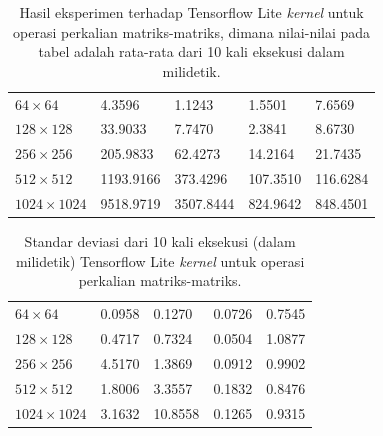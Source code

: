 \begin{table}
	\centering
	\caption{Hasil eksperimen terhadap Tensorflow Lite \textit{kernel} untuk operasi perkalian matriks-matriks, dimana nilai-nilai pada tabel adalah rata-rata dari 10 kali eksekusi dalam milidetik.}
	\label{tab:matmatmulspeed}
	\begin{tabular}{|>{\small}R{2.5cm}|>{\small}R{2.1cm}|>{\small}R{2.1cm}|>{\small}R{2.1cm}|>{\small}R{2.4cm}|}
		\hline
		 & 
		 & 
		 & 
		 & 
		 \\
		\hline
		$64 \times 64$ & 4.3596 & 1.1243 & 1.5501 & 7.6569
		\\
		\hline
		$128 \times 128$ & 33.9033 & 7.7470 & 2.3841 & 8.6730
		\\
		\hline
		$256 \times 256$ & 205.9833 & 62.4273 & 14.2164 & 21.7435
		\\
		\hline
		$512 \times 512$ & 1193.9166 & 373.4296 & 107.3510 & 116.6284
		\\
		\hline
		$1024 \times 1024$ & 9518.9719 & 3507.8444 & 824.9642 & 848.4501
		\\
		\hline
	\end{tabular}
\end{table}

\begin{table}
	\centering
	\caption{Standar deviasi dari 10 kali eksekusi (dalam milidetik) Tensorflow Lite \textit{kernel} untuk operasi perkalian matriks-matriks.}
	\label{tab:matmatmuldev}
	\begin{tabular}{|>{\small}R{2.5cm}|>{\small}R{2.1cm}|>{\small}R{2.1cm}|>{\small}R{2.1cm}|>{\small}R{2.4cm}|}
	\hline
	 & 
	 & 
	 & 
	 & 
	 \\
	\hline
		$64 \times 64$ & 0.0958 & 0.1270 & 0.0726 & 0.7545
		\\
		\hline
		$128 \times 128$ & 0.4717 & 0.7324 & 0.0504 & 1.0877
		\\
		\hline
		$256 \times 256$ & 4.5170 & 1.3869 & 0.0912 & 0.9902
		\\
		\hline
		$512 \times 512$ & 1.8006 & 3.3557 & 0.1832 & 0.8476
		\\
		\hline
		$1024 \times 1024$ & 3.1632 & 10.8558 & 0.1265 & 0.9315
		\\
		\hline
	\end{tabular}
\end{table}

